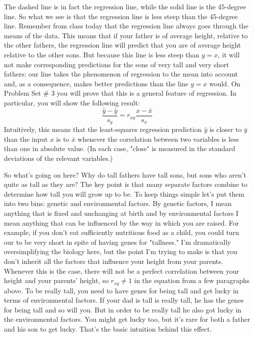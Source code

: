 \documentclass[12pt]{article}
\begin{document}
The dashed line is in fact the regression line, while the solid line is the 45-degree line.
So what we see is that the regression line is less steep than the 45-degree line.
Remember from class today that the regression line always goes through the means of the data.
This means that if your father is of average height, relative to the other fathers, the regression line will predict that you are of average height relative to the other sons.
But because this line is less steep than $y=x$, it will not make corresponding predictions for the sons of very tall and very short fathers: our line takes the phenomenon of regression to the mean into account and, as a consequence, makes better predictions than the line $y=x$ would.
On Problem Set \# 3 you will prove that this is a general feature of regression. In particular, you will show the following result:
$$\frac{\hat{y}-\bar{y}}{s_y} = r_{xy} \frac{x-\bar{x}}{s_x}$$
Intuitively, this means that the least-squares regression prediction $\hat{y}$ is closer to $\bar{y}$ than the input $x$ is to $\bar{x}$ whenever the correlation between two variables is less than one in absolute value.
(In each case, "close" is measured in the standard deviations of the relevant variables.)

So what's going on here?
Why do tall fathers have tall sons, but sons who aren't quite as tall as they are?
The key point is that many separate factors combine to determine how tall you will grow up to be.
To keep things simple let's put them into two bins: genetic and environmental factors.
By genetic factors, I mean anything that is fixed and unchanging at birth and by environmental factors I mean anything that can be influenced by the way in which you are raised.
For example, if you don't eat sufficiently nutritious food as a child, you could turn our to be very short in spite of having genes for "tallness."
I'm dramatically oversimplifying the biology here, but the point I'm trying to make is that you don't inherit all the factors that influence your height from your parents.
Whenever this is the case, there will not be a perfect correlation between your height and your parents' height, so $r_{xy}\neq 1$ in the equation from a few paragraphs above.
To be really tall, you need to have genes for being tall and get lucky in terms of environmental factors.
If your dad is tall is really tall, he has the genes for being tall and so will you.
But in order to be really tall he also got lucky in the environmental factors.
You might get lucky too, but it's rare for both a father and his son to get lucky.
That's the basic intuition behind this effect.
\end{document}
